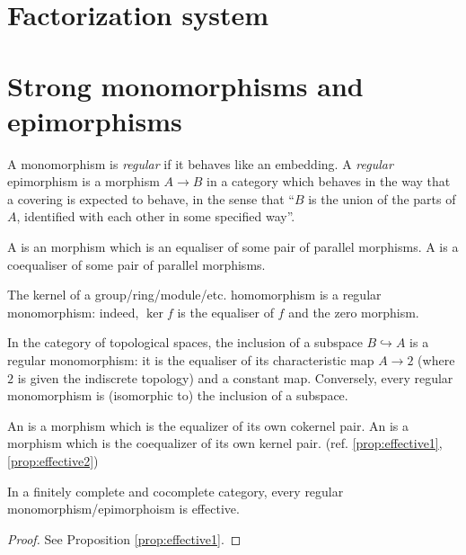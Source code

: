 \section{Factorization system}

\newpage\section{Strong monomorphisms and epimorphisms}
A monomorphism is \emph{regular} if it behaves like an embedding.
A \emph{regular} epimorphism is a morphism $A\to B$ in a category which behaves in the way that a covering is expected to behave, in the sense that ``$B$ is the union of the parts of $A$, identified with each other in some specified way''.
\begin{defn}
  A  is an morphism which is an equaliser of some pair of parallel morphisms. A  is a coequaliser of some pair of parallel morphisms.
\end{defn}
\begin{exam}
  The kernel of a group/ring/module/etc. homomorphism is a regular monomorphism: indeed, $\ker f$ is the equaliser of $f$ and the zero morphism.
\end{exam}
\begin{exam}
  In the category of topological spaces, the inclusion of a subspace $B\hookrightarrow A$ is a regular monomorphism: it is the equaliser of its characteristic map $A\to 2$ (where $2$ is given the indiscrete topology) and a constant map. Conversely, every regular monomorphism is (isomorphic to) the inclusion of a subspace.
\end{exam}

\begin{defn}
  An  is a morphism which is the equalizer of its own cokernel pair. An  is a morphism which is the coequalizer of its own kernel pair. (ref. \ref{prop:effective1}, \ref{prop:effective2})
\end{defn}

\begin{prop}
  In a finitely complete and cocomplete category, every regular monomorphism/epimorphoism is effective.
\end{prop}
\begin{proof}
  See Proposition \ref{prop:effective1}.
\end{proof}

